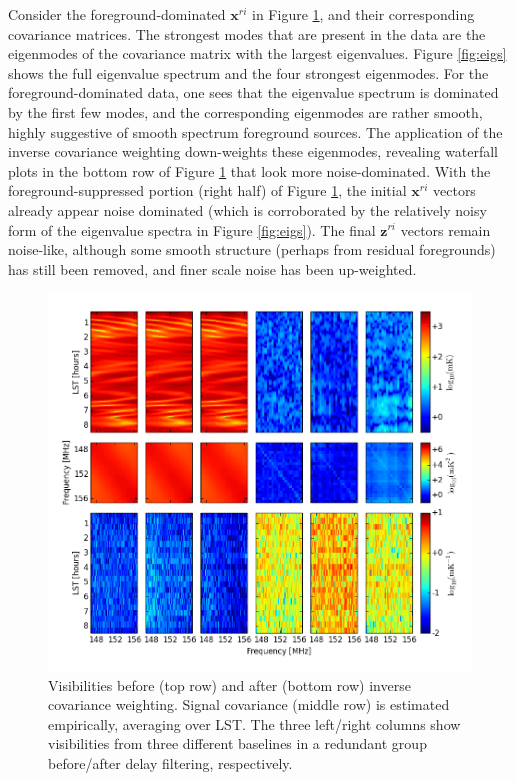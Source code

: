\documentclass[twocolumn,numberedappendix]{emulateapj} \shorttitle{New Limits on the 21 cm Power Spectrum at $z=8.4$}
\begin{document}
Consider the foreground-dominated $\mathbf{x}^{ri}$ in Figure \ref{fig:inv_cov}, and
their corresponding covariance matrices. The strongest modes that are present in the
data are the eigenmodes of the covariance matrix with the largest eigenvalues. Figure
\ref{fig:eigs} shows the full eigenvalue spectrum and the four strongest eigenmodes.
For the foreground-dominated data, one sees that the eigenvalue spectrum is dominated
by the first few modes, and the corresponding eigenmodes are rather smooth, highly suggestive
of smooth spectrum foreground sources. The application of the inverse covariance weighting
down-weights these eigenmodes, revealing waterfall plots in the bottom row of Figure \ref{fig:inv_cov}
that look more noise-dominated. With the foreground-suppressed portion (right half) of Figure \ref{fig:inv_cov},
the initial $\mathbf{x}^{ri}$ vectors already appear noise dominated (which is corroborated by the
relatively noisy form of the eigenvalue spectra in Figure \ref{fig:eigs}). The final $\mathbf{z}^{ri}$ vectors
remain noise-like, although some smooth structure (perhaps from residual foregrounds) has still been removed, and finer scale noise
has been up-weighted.

\begin{figure}\centering
\includegraphics[width=2\columnwidth]{plots/inv_cov.png}
\caption{
Visibilities before (top row) and after (bottom row) inverse covariance weighting.
Signal covariance (middle row) is estimated empirically, averaging over LST.
The three left/right columns show visibilities from
three different baselines in a redundant group before/after delay filtering, respectively.
} \label{fig:inv_cov}
\end{figure}
\end{document}
